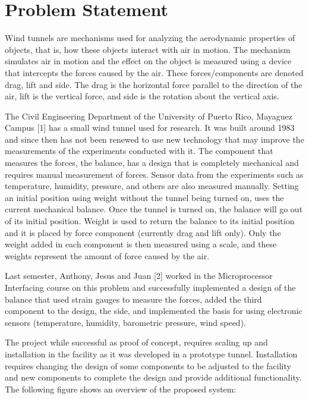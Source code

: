 \section{Problem Statement}
	Wind tunnels are mechanisms used for analyzing the aerodynamic properties of objects,
	that is, how these objects interact with air in motion. The mechanism simulates air in motion and
	the effect on the object is measured using a device that intercepts the forces caused by the air.
	These forces/components are denoted drag, lift and side. The drag is the horizontal force parallel
	to the direction of the air, lift is the vertical force, and side is the rotation about the vertical axis.

	The Civil Engineering Department of the University of Puerto Rico, Mayaguez Campus
	[1] has a small wind tunnel used for research. It was built around 1983 and since then has not
	been renewed to use new technology that may improve the measurements of the experiments conducted with it. The
	component that measures the forces, the balance, has a design that is completely mechanical and
	requires manual measurement of forces. Sensor data from the experiments such as temperature,
	humidity, pressure, and others are also measured manually.
	Setting an initial position using weight without the tunnel being turned on, uses the
	current mechanical balance. Once the tunnel is turned on, the balance will go out of its initial
	position. Weight is used to return the balance to its initial position and it is placed by force component
	(currently drag and lift only). Only the weight added in each component is then measured using a
	scale, and these weights represent the amount of force caused by the air.
	
	Last semester, Anthony, Jesus and Juan [2] worked in the
	Microprocessor Interfacing course on this problem and successfully implemented a design of the
	balance that used strain gauges to measure the forces, added the third component
	to the design, the side, and implemented the
	basis for using electronic sensors
	(temperature, humidity, barometric pressure, wind speed).
	
	The project while successful as proof of concept, requires scaling up and
	installation in the facility as it was developed in a prototype tunnel. Installation requires
	changing the design of some components to be adjusted to the facility and new components 
	to complete the design and provide additional functionality. The following figure shows an overview
	of the proposed system:

